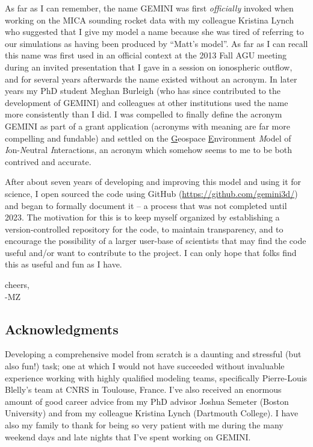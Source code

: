 \documentclass[11pt,letterpaper]{article}
\begin{document}
As far as I can remember, the name GEMINI was first \emph{officially} invoked when working on the MICA sounding rocket data with my colleague Kristina Lynch who suggested that I give my model a name because she was tired of referring to our simulations as having been produced by ``Matt's model''.  As far as I can recall this name was first used in an official context at the 2013 Fall AGU meeting during an invited presentation that I gave in a session on ionospheric outflow, and for several years afterwards the name existed without an acronym.  In later years my PhD student Meghan Burleigh (who has since contributed to the development of GEMINI) and colleagues at other institutions used the name more consistently than I did.  I was compelled to finally define the acronym GEMINI as part of a grant application (acronyms with meaning are far more compelling and fundable) and settled on the \underline{G}eospace \underline{E}nvironment \emph{M}odel of \emph{I}on-\emph{N}eutral \emph{I}nteractions, an acronym which somehow seems to me to be both contrived and accurate.  

After about seven years of developing and improving this model and using it for science, I open sourced the code using GitHub (\url{https://github.com/gemini3d/}) and began to formally document it -- a process that was not completed until 2023.  The motivation for this is to keep myself organized by establishing a version-controlled repository for the code, to maintain transparency, and to encourage the possibility of a larger user-base of scientists that may find the code useful and/or want to contribute to the project.  I can only hope that folks find this as useful and fun as I have.  

cheers,\\
-MZ


\subsection{Acknowledgments}

Developing a comprehensive model from scratch is a daunting and stressful (but also fun!) task; one at which I would not have succeeded without invaluable experience working with highly qualified modeling teams, specifically Pierre-Louis Blelly's team at CNRS in Toulouse, France.  I've also received an enormous amount of good career advice from my PhD advisor Joshua Semeter (Boston University) and from my colleague Kristina Lynch (Dartmouth College).  I have also my family to thank for being so very patient with me during the many weekend days and late nights that I've spent working on GEMINI.  
\end{document}
